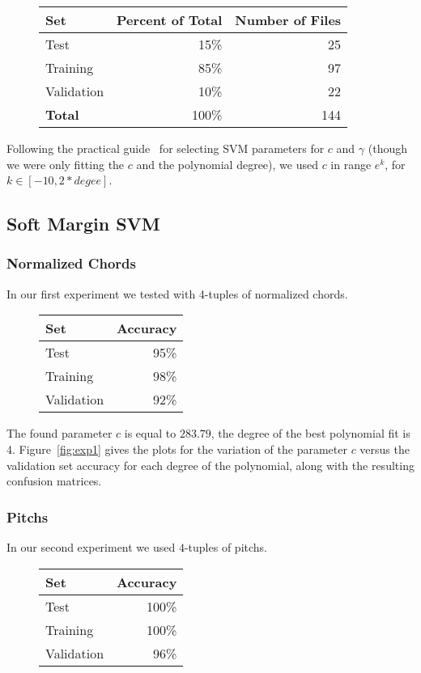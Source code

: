 \documentclass[twocolumn,dvipsnames]{article}
\begin{document}
\begin{figure}[h!]
\centering
\begin{tabular}{lrr}
\toprule
Set        & Percent of Total & Number of Files \\
\midrule
Test       &             15\% &              25 \\
Training   &             85\% &              97 \\
Validation &             10\% &              22 \\
\midrule
\textbf{Total} &        100\% &             144 \\
\bottomrule
\end{tabular}
\end{figure}

Following the practical guide~\cite{hsu2003practical} for selecting SVM parameters for $c$ and $\gamma$
(though we were only fitting the $c$ and the polynomial degree), we used $c$ in range $e^k$,
for $k \in [-10, 2*degee]$.

\subsection{Soft Margin SVM}
\subsubsection{Normalized Chords}
In our first experiment we tested with 4-tuples of normalized chords.
\begin{figure}[h!]
\centering
\begin{tabular}{lr}
\toprule
Set        & Accuracy \\
\midrule
Test       &     95\% \\
Training   &     98\% \\
Validation &     92\% \\
\bottomrule
\end{tabular}
\end{figure}

The found parameter $c$ is equal to $283.79$,
the degree of the best polynomial fit is 4.
Figure~\ref{fig:exp1} gives the plots for the variation of the parameter $c$ versus the validation set accuracy for each degree of the polynomial,
along with the resulting confusion matrices.

\subsubsection{Pitchs}
In our second experiment we used $4$-tuples of pitchs.
\begin{figure}[h!]
\centering
\begin{tabular}{lr}
\toprule
Set        & Accuracy \\
\midrule
Test       &    100\% \\
Training   &    100\% \\
Validation &     96\% \\
\bottomrule
\end{tabular}
\end{figure}
\end{document}
